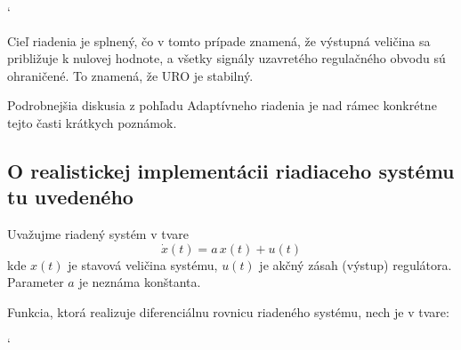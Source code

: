 \documentclass[a4paper, 10pt, ]{article}
\begin{document}
{\catcode`

}



\begin{centering}


    \vspace{-2mm}

    \figcaption{}

    \vspace{2mm}

    \label{figsc_ar02_fig01_1}

\end{centering}

\noindent
Cieľ riadenia je splnený, čo v tomto prípade znamená, že výstupná veličina sa približuje k nulovej hodnote, a všetky signály uzavretého regulačného obvodu sú ohraničené. To znamená, že URO je stabilný.

Podrobnejšia diskusia z pohľadu Adaptívneho riadenia je nad rámec konkrétne tejto časti krátkych poznámok.













\subsection{O realistickej implementácii riadiaceho systému tu uvedeného}


Uvažujme riadený systém v tvare
\begin{equation}
	\dot{x}(t) = a\, x(t) + u(t)
\end{equation}
kde $x(t)$ je stavová veličina systému, $u(t)$ je akčný zásah (výstup) regulátora. Parameter $a$ je neznáma konštanta.

Funkcia, ktorá realizuje diferenciálnu rovnicu riadeného systému, nech je v tvare:


{\catcode`

}
\end{document}
